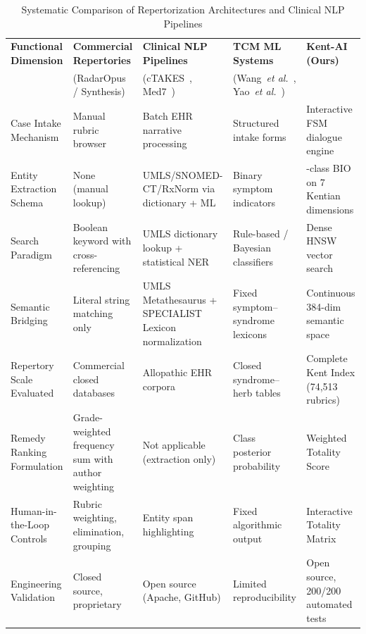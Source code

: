 \begin{table}[!t]
\caption{Systematic Comparison of Repertorization Architectures and Clinical NLP Pipelines}
\label{tab:system_comparison}
\centering
\footnotesize
\begin{tabular*}{\textwidth}{@{\extracolsep{\fill}}>{\raggedright\arraybackslash}p{}>{\raggedright\arraybackslash}p{}>{\raggedright\arraybackslash}p{}>{\raggedright\arraybackslash}p{}>{\raggedright\arraybackslash}p{}@{}}
\toprule
\textbf{Functional Dimension} & \textbf{Commercial Repertories} & \textbf{Clinical NLP Pipelines} & \textbf{TCM ML Systems} & \textbf{Kent-AI (Ours)} \\
 & (RadarOpus / Synthesis)~\cite{radaropus2024} & (cTAKES~\cite{savova2010mayo}, Med7~\cite{kormilitzin2021med7}) & (Wang~\textit{et al.}~\cite{wang2006bayesian}, Yao~\textit{et al.}~\cite{yao2018topic}) &  \\
\midrule
Case Intake Mechanism & Manual rubric browser & Batch EHR narrative processing & Structured intake forms & Interactive FSM dialogue engine \\
Entity Extraction Schema & None (manual lookup) & UMLS/SNOMED-CT/RxNorm via dictionary + ML & Binary symptom indicators & 15-class BIO on 7 Kentian dimensions \\
Search Paradigm & Boolean keyword with cross-referencing & UMLS dictionary lookup + statistical NER & Rule-based / Bayesian classifiers & Dense HNSW vector search \\
Semantic Bridging & Literal string matching only & UMLS Metathesaurus + SPECIALIST Lexicon normalization & Fixed symptom--syndrome lexicons & Continuous 384-dim semantic space \\
Repertory Scale Evaluated & Commercial closed databases & Allopathic EHR corpora & Closed syndrome--herb tables & Complete Kent Index (74,513 rubrics) \\
Remedy Ranking Formulation & Grade-weighted frequency sum with author weighting & Not applicable (extraction only) & Class posterior probability & Weighted Totality Score \\
Human-in-the-Loop Controls & Rubric weighting, elimination, grouping & Entity span highlighting & Fixed algorithmic output & Interactive Totality Matrix \\
Engineering Validation & Closed source, proprietary & Open source (Apache, GitHub) & Limited reproducibility & Open source, 200/200 automated tests \\
\bottomrule
\end{tabular*}
\end{table}

